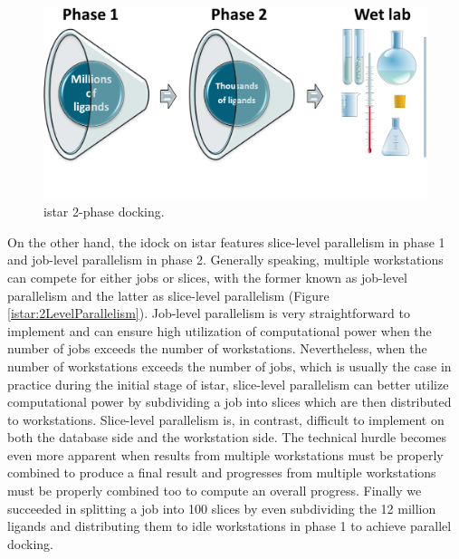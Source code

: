 \begin{figure}
\centering
\includegraphics[width=\linewidth]{istar/2PhaseDocking.png}
\caption{istar 2-phase docking.}
\label{istar:2PhaseDocking}
\end{figure}

On the other hand, the idock on istar features slice-level parallelism in phase 1 and job-level parallelism in phase 2. Generally speaking, multiple workstations can compete for either jobs or slices, with the former known as job-level parallelism and the latter as slice-level parallelism (Figure \ref{istar:2LevelParallelism}). Job-level parallelism is very straightforward to implement and can ensure high utilization of computational power when the number of jobs exceeds the number of workstations. Nevertheless, when the number of workstations exceeds the number of jobs, which is usually the case in practice during the initial stage of istar, slice-level parallelism can better utilize computational power by subdividing a job into slices which are then distributed to workstations. Slice-level parallelism is, in contrast, difficult to implement on both the database side and the workstation side. The technical hurdle becomes even more apparent when results from multiple workstations must be properly combined to produce a final result and progresses from multiple workstations must be properly combined too to compute an overall progress. Finally we succeeded in splitting a job into 100 slices by even subdividing the 12 million ligands and distributing them to idle workstations in phase 1 to achieve parallel docking.


